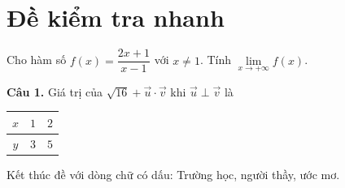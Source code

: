 \documentclass[12pt]{article}
\begin{document}
\section*{Đề kiểm tra nhanh}
Cho hàm số $f(x)=\dfrac{2x+1}{x-1}$ với $x\neq 1$. Tính $\lim\limits_{x\to+\infty} f(x)$.



\textbf{Câu 1.} 
Giá trị của $\sqrt{16}+\vec{u}\cdot\vec{v}$ khi $\vec u\perp\vec v$ là





\begin{tabular}{|c|c|c|}
\hline
$x$ & $1$ & $2$ \\ \hline
$y$ & $3$ & $5$ \\ \hline
\end{tabular}

Kết thúc đề với dòng chữ có dấu: Trường học, người thầy, ước mơ.
\end{document}
